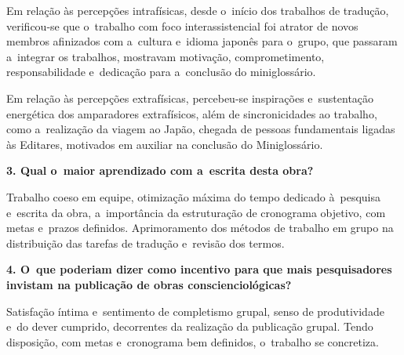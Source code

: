 \documentclass{gescons}
\begin{document}
\begin{multicols}{2}
Em relação às percepções intrafísicas, desde o~início dos trabalhos de tradução, verificou-se que o~trabalho com foco interassistencial foi atrator de novos membros afinizados com a~cultura e~idioma japonês para o~grupo, que passaram a~integrar os trabalhos, mostravam motivação, comprometimento, responsabilidade e~dedicação para a~conclusão do miniglossário.

Em relação às percepções extrafísicas, percebeu-se inspirações e~sustentação energética dos amparadores extrafísicos, além de sincronicidades ao trabalho, como a~realização da viagem ao Japão, chegada de pessoas fundamentais ligadas às Editares, motivados em auxiliar na conclusão do Miniglossário.

\textbf{3. Qual o~maior aprendizado com a~escrita desta obra?}

Trabalho coeso em equipe, otimização máxima do tempo dedicado à~pesquisa e~escrita da obra, a~importância da estruturação de cronograma objetivo, com metas e~prazos definidos. Aprimoramento dos métodos de trabalho em grupo na distribuição das tarefas de tradução e~revisão dos termos.


\textbf{4. O~que poderiam dizer como incentivo para que mais pesquisadores invistam na publicação de obras conscienciológicas?}

Satisfação íntima e~sentimento de completismo grupal, senso de produtividade e~do dever cumprido, decorrentes da realização da publicação grupal. Tendo disposição, com metas e~cronograma bem definidos, o~trabalho se concretiza.

    \end{multicols}
\end{document}
